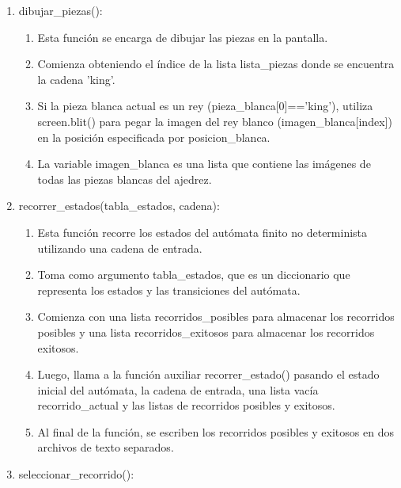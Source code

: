 \begin{enumerate}
\begin{enumerate}
    \item dibujar\_piezas():\newline
    \begin{enumerate}
        \item Esta función se encarga de dibujar las piezas en la pantalla.\newline
        \item Comienza obteniendo el índice de la lista lista\_piezas donde se encuentra la cadena 'king'.\newline
        \item Si la pieza blanca actual es un rey (pieza\_blanca[0]=='king'), utiliza screen.blit() para pegar la imagen del rey blanco (imagen\_blanca[index]) en la posición especificada por posicion\_blanca.\newline
        \item La variable imagen\_blanca es una lista que contiene las imágenes de todas las piezas blancas del ajedrez.\newline
    \end{enumerate}
    \item recorrer\_estados(tabla\_estados, cadena):\newline
    \begin{enumerate}
        \item Esta función recorre los estados del autómata finito no determinista utilizando una cadena de entrada.\newline
        \item Toma como argumento tabla\_estados, que es un diccionario que representa los estados y las transiciones del autómata.\newline
        \item Comienza con una lista recorridos\_posibles para almacenar los recorridos posibles y una lista recorridos\_exitosos para almacenar los recorridos exitosos.\newline
        \item Luego, llama a la función auxiliar recorrer\_estado() pasando el estado inicial del autómata, la cadena de entrada, una lista vacía recorrido\_actual y las listas de recorridos posibles y exitosos.\newline
        \item Al final de la función, se escriben los recorridos posibles y exitosos en dos archivos de texto separados.\newline
    \end{enumerate}
    \item seleccionar\_recorrido():\newline

\end{enumerate}
\end{enumerate}
